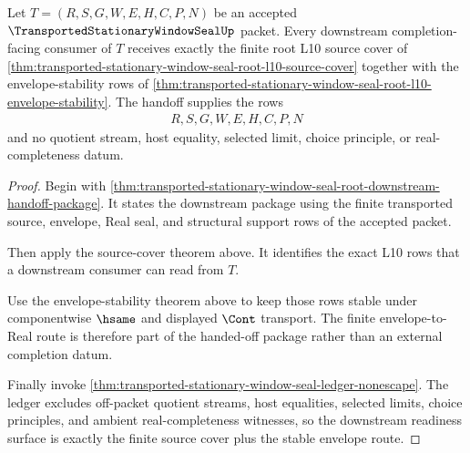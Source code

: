 \begin{theorem}
\label{thm:transported-stationary-window-seal-root-l10-downstream-readiness}
Let $T=(R,S,G,W,E,H,C,P,N)$ be an accepted $\TransportedStationaryWindowSealUp$ packet. Every downstream completion-facing consumer of $T$ receives exactly the finite root L10 source cover of \autoref{thm:transported-stationary-window-seal-root-l10-source-cover} together with the envelope-stability rows of \autoref{thm:transported-stationary-window-seal-root-l10-envelope-stability}. The handoff supplies the rows
$$
\begin{aligned}
  R,S,G,W,E,H,C,P,N
\end{aligned}
$$
and no quotient stream, host equality, selected limit, choice principle, or real-completeness datum.
\end{theorem}
\begin{proof}
Begin with \autoref{thm:transported-stationary-window-seal-root-downstream-handoff-package}. It states the downstream package using the finite transported source, envelope, Real seal, and structural support rows of the accepted packet.

Then apply the source-cover theorem above. It identifies the exact L10 rows that a downstream consumer can read from $T$.

Use the envelope-stability theorem above to keep those rows stable under componentwise $\hsame$ and displayed $\Cont$ transport. The finite envelope-to-Real route is therefore part of the handed-off package rather than an external completion datum.

Finally invoke \autoref{thm:transported-stationary-window-seal-ledger-nonescape}. The ledger excludes off-packet quotient streams, host equalities, selected limits, choice principles, and ambient real-completeness witnesses, so the downstream readiness surface is exactly the finite source cover plus the stable envelope route.
\end{proof}
